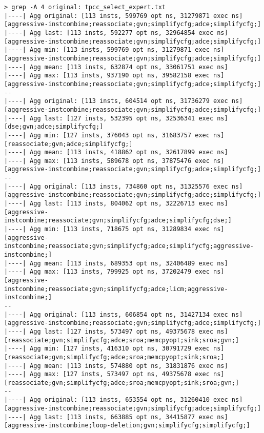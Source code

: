 \documentclass{vldb}
\begin{document}
\begin{lstlisting}
> grep -A 4 original: tpcc_select_expert.txt  
|----| Agg original: [113 insts, 599769 opt ns, 31279871 exec ns] [aggressive-instcombine;reassociate;gvn;simplifycfg;adce;simplifycfg;]
|----| Agg last: [113 insts, 592277 opt ns, 32964854 exec ns] [aggressive-instcombine;reassociate;gvn;simplifycfg;adce;simplifycfg;]
|----| Agg min: [113 insts, 599769 opt ns, 31279871 exec ns] [aggressive-instcombine;reassociate;gvn;simplifycfg;adce;simplifycfg;]
|----| Agg mean: [113 insts, 632874 opt ns, 33061751 exec ns]
|----| Agg max: [113 insts, 937190 opt ns, 39582158 exec ns] [aggressive-instcombine;reassociate;gvn;simplifycfg;adce;simplifycfg;]
--
|----| Agg original: [113 insts, 604514 opt ns, 31736279 exec ns] [aggressive-instcombine;reassociate;gvn;simplifycfg;adce;simplifycfg;]
|----| Agg last: [127 insts, 532395 opt ns, 32536341 exec ns] [dse;gvn;adce;simplifycfg;]
|----| Agg min: [127 insts, 376043 opt ns, 31683757 exec ns] [reassociate;gvn;adce;simplifycfg;]
|----| Agg mean: [113 insts, 418862 opt ns, 32617899 exec ns]
|----| Agg max: [113 insts, 589678 opt ns, 37875476 exec ns] [aggressive-instcombine;reassociate;gvn;simplifycfg;adce;simplifycfg;]
--
|----| Agg original: [113 insts, 734860 opt ns, 31325576 exec ns] [aggressive-instcombine;reassociate;gvn;simplifycfg;adce;simplifycfg;]
|----| Agg last: [113 insts, 804062 opt ns, 32226713 exec ns] [aggressive-instcombine;reassociate;gvn;simplifycfg;adce;simplifycfg;dse;]
|----| Agg min: [113 insts, 718675 opt ns, 31289834 exec ns] [aggressive-instcombine;reassociate;gvn;simplifycfg;adce;simplifycfg;aggressive-instcombine;]
|----| Agg mean: [113 insts, 689353 opt ns, 32406489 exec ns]
|----| Agg max: [113 insts, 799925 opt ns, 37202479 exec ns] [aggressive-instcombine;reassociate;gvn;simplifycfg;adce;licm;aggressive-instcombine;]
--
|----| Agg original: [113 insts, 606854 opt ns, 31427134 exec ns] [aggressive-instcombine;reassociate;gvn;simplifycfg;adce;simplifycfg;]
|----| Agg last: [127 insts, 573497 opt ns, 49375678 exec ns] [reassociate;gvn;simplifycfg;adce;sroa;memcpyopt;sink;sroa;gvn;]
|----| Agg min: [127 insts, 416310 opt ns, 30791729 exec ns] [reassociate;gvn;simplifycfg;adce;sroa;memcpyopt;sink;sroa;]
|----| Agg mean: [113 insts, 574880 opt ns, 31831876 exec ns]
|----| Agg max: [127 insts, 573497 opt ns, 49375678 exec ns] [reassociate;gvn;simplifycfg;adce;sroa;memcpyopt;sink;sroa;gvn;]
--
|----| Agg original: [113 insts, 653554 opt ns, 31260410 exec ns] [aggressive-instcombine;reassociate;gvn;simplifycfg;adce;simplifycfg;]
|----| Agg last: [113 insts, 663885 opt ns, 34415877 exec ns] [aggressive-instcombine;loop-deletion;gvn;simplifycfg;simplifycfg;]

\end{lstlisting}
\end{document}
